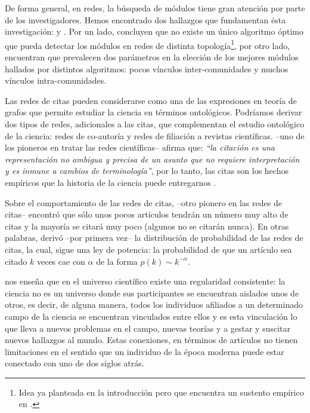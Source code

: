 \documentclass[12pt,letter]{article}
\begin{document}
\vspace{0.5cm}


De forma general, en redes, la búsqueda de módulos tiene gran atención por parte de los investigadores. Hemos encontrado dos hallazgos que fundamentan ésta investigación: \cite{Lancichinetti} y \cite{Orman}. Por un lado, \cite{Lancichinetti} concluyen que no existe un único algoritmo óptimo que pueda detectar los módulos en redes de distinta topología\footnote{Idea ya planteada en la introducción pero que encuentra un sustento empírico en \citep{Lancichinetti}.}, por otro lado, \cite{Orman} encuentran que prevalecen dos parámetros en la elección de los mejores módulos hallados por distintos algoritmos: pocos vínculos inter-comunidades y muchos vínculos intra-comunidades.

\vspace{0.5cm}

Las redes de citas pueden considerarse como una de las expresiones en teoría de grafos que permite estudiar la ciencia en términos ontológicos. Podríamos derivar dos tipos de redes, adicionales a las citas, que complementan el estudio ontológico de la ciencia: redes de co-autoría y redes de filiación a revistas científicas. \citet[Cap. 3]{Gardfield1}  --uno de los pioneros en tratar las redes científicas-- afirma que: {\it ``la citación es una representación no ambigua y precisa de un asunto que no requiere interpretación y es inmune a cambios de terminología''}, por lo tanto, las citas son los hechos empíricos que la historia de la ciencia puede entregarnos \citep{Salazar1}. 

\vspace{0.5cm}
Sobre el comportamiento de las redes de citas, \cite{SollaPrice} --otro pionero en las redes de citas-- encontró que sólo unos pocos artículos tendrán un número muy alto de citas y la mayoría se citará muy poco (algunos no se citarán nunca). En otras palabras, \cite{SollaPrice} derivó --por primera vez-- la distribución de probabilidad de las redes de citas, la cual, sigue una ley de potencia: la probabilidad de que un artículo sea citado $k$ veces cae con $\alpha$ de la forma $p(k) \sim k^{-\alpha}$.

\vspace{0.5cm}
\cite{Cronin1, Cronin2} nos enseña que en el universo científico existe una regularidad consistente: la ciencia no es un universo donde sus participantes se encuentran aislados unos de otros, es decir, de alguna manera, todos los individuos afiliados a un determinado campo de la ciencia se encuentran vinculados entre ellos y es esta vinculación lo que lleva a nuevos problemas en el campo, nuevas teorías y a gestar y suscitar nuevos hallazgos al mundo. Estas conexiones, en términos de artículos no tienen limitaciones en el sentido que un individuo de la época moderna puede estar conectado con uno de dos siglos atrás.
\end{document}
